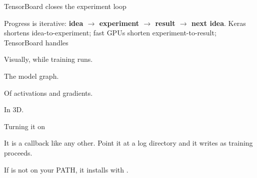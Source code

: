 \documentclass[aspectratio=169,11pt,t]{beamer}
\begin{document}
\begin{frame}[shrink=25]{TensorBoard closes the experiment loop}
{\fontsize{9.4}{12.6}\selectfont\color{fg2}Progress is iterative: \textbf{idea $\rightarrow$ experiment $\rightarrow$ result $\rightarrow$ next idea}. Keras shortens idea-to-experiment; fast GPUs shorten experiment-to-result; TensorBoard handles \par}\vskip 4pt
\begin{minipage}[t]{0.241\textwidth}
\begin{icard}
Visually, while training runs.
\end{icard}
\end{minipage}%
\hfill
\begin{minipage}[t]{0.241\textwidth}
\begin{icard}
The model graph.
\end{icard}
\end{minipage}%
\hfill
\begin{minipage}[t]{0.241\textwidth}
\begin{icard}
Of activations and gradients.
\end{icard}
\end{minipage}%
\hfill
\begin{minipage}[t]{0.241\textwidth}
\begin{icard}
In 3D.
\end{icard}
\end{minipage}%
\end{frame}

\begin{frame}[shrink=25]{Turning it on}
{\fontsize{9.4}{12.6}\selectfont\color{fg2}It is a callback like any other. Point it at a log directory and it writes as training proceeds.\par}\vskip 4pt
{\fontsize{9.4}{12.6}\selectfont\color{fg2}If  is not on your PATH, it installs with .\par}\vskip 4pt
\end{frame}

\end{document}
